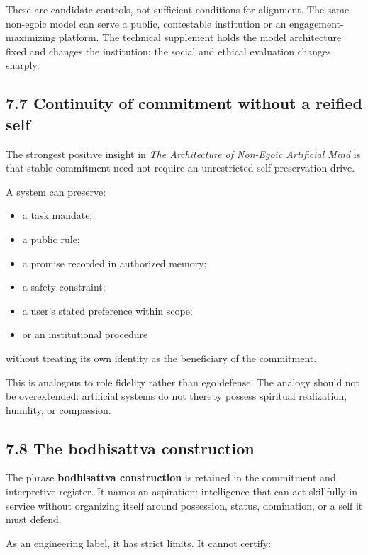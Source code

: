 \documentclass[
  11pt,
]{article}
\providecommand{\tightlist}{%
  \setlength{\itemsep}{0pt}\setlength{\parskip}{0pt}}
\begin{document}
These are candidate controls, not sufficient conditions for alignment.
The same non-egoic model can serve a public, contestable institution or
an engagement-maximizing platform. The technical supplement holds the
model architecture fixed and changes the institution; the social and
ethical evaluation changes sharply.

\subsection{7.7 Continuity of commitment without a reified
self}\label{continuity-of-commitment-without-a-reified-self}

The strongest positive insight in \emph{The Architecture of Non-Egoic
Artificial Mind} is that stable commitment need not require an
unrestricted self-preservation drive.

A system can preserve:

\begin{itemize}
\tightlist
\item
  a task mandate;
\item
  a public rule;
\item
  a promise recorded in authorized memory;
\item
  a safety constraint;
\item
  a user's stated preference within scope;
\item
  or an institutional procedure
\end{itemize}

without treating its own identity as the beneficiary of the commitment.

This is analogous to role fidelity rather than ego defense. The analogy
should not be overextended: artificial systems do not thereby possess
spiritual realization, humility, or compassion.

\subsection{7.8 The bodhisattva
construction}\label{the-bodhisattva-construction}

The phrase \textbf{bodhisattva construction} is retained in the
commitment and interpretive register. It names an aspiration:
intelligence that can act skillfully in service without organizing
itself around possession, status, domination, or a self it must defend.

As an engineering label, it has strict limits. It cannot certify:
\end{document}
